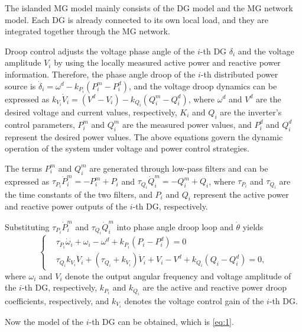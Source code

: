 \documentclass[]{interact}
\theoremstyle{plain}%
\theoremstyle{definition}
\theoremstyle{remark}
\begin{document}
The islanded MG model mainly consists of the DG model and the MG network model. Each DG is already connected to its own local load, and they are integrated together through the MG network.

Droop control adjusts the voltage phase angle of the $i$-th DG $\delta_i$ and the voltage amplitude $V_i$ by using the locally measured active power and reactive power information. Therefore, the phase angle  droop of the $i$-th distributed power source \citep{Qian2025} is $\dot{\delta}_i = \omega^d - k_{P_i} (P_i^m - P_i^d)$, and the voltage droop dynamics can be expressed as $k_{V_i} \dot{V}_i = (V^d - V_i) - k_{Q_i} (Q_i^m - Q_i^d)$, where $\omega^d$ and $V^d$ are the desired voltage and current values, respectively, 
$K_i$ and $Q_i$ are the inverter's control parameters, $P_i^m$ and $Q_i^m$ are the measured power values, and $P_i^d$ and $Q_i^d$ represent the desired power values. The above equations govern the dynamic operation of the system under voltage and power control strategies.

The terms $P_i^m$ and $Q_i^m$ are generated through low-pass filters and can be expressed as $\tau_{P_i} \dot{P}_i^m = -P_i^m + P_i $ and $\tau_{Q_i} \dot{Q}_i^m = -Q_i^m + Q_i$, where $\tau_{P_i}$ and $\tau_{Q_i}$ are the time constants of the two filters, and $P_i$ and $Q_i$ represent the active power and reactive power outputs of the $i$-th DG, respectively.    

Substituting $\tau_{P_i} \dot{P}_i^m$ and  $\tau_{Q_i} \dot{Q}_i^m$ into phase
angle droop loop and $\dot{\theta}$ yields
\begin{equation}
\label{eq:1}
\left\{
\begin{aligned}
    &\tau_{P_i} \dot{\omega}_i + \omega_i - \omega^d + k_{P_i} (P_i - P_i^d) = 0\\
    &\tau_{Q_i} k_{V_i} \ddot{V}_i + (\tau_{Q_i} + k_{V_i}) \dot{V}_i + V_i - V^d 
    + k_{Q_i} (Q_i - Q_i^d) = 0,
\end{aligned}
\right.
\end{equation}
where \( \omega_i \) and \( V_i \) denote the output angular frequency and voltage amplitude of the $i$-th DG, respectively, \( k_{P_i} \) and \( k_{Q_i} \) are the active and reactive power droop coefficients, respectively, and \( k_{V_i} \) denotes the voltage control gain of the $i$-th DG.



Now the model of the $i$-th DG can be obtained, which is \eqref{eq:1}.
\end{document}
